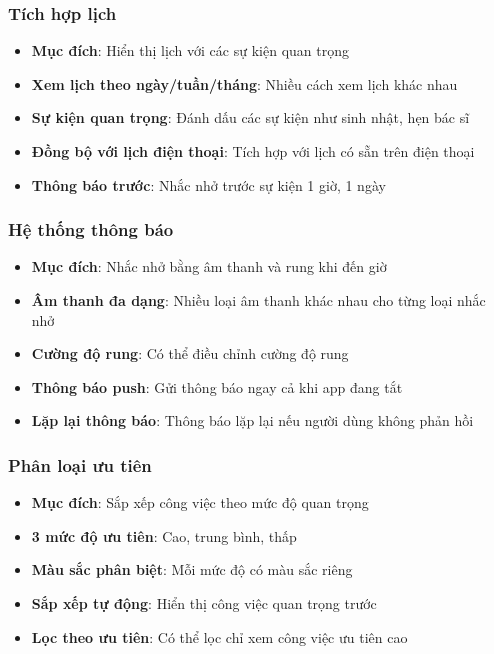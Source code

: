 \documentclass[12pt,a4paper]{article}
\begin{document}
\subsubsection{Tích hợp lịch}
\begin{itemize}[leftmargin=2cm]
    \item \textbf{Mục đích}: Hiển thị lịch với các sự kiện quan trọng
    \item \textbf{Xem lịch theo ngày/tuần/tháng}: Nhiều cách xem lịch khác nhau
    \item \textbf{Sự kiện quan trọng}: Đánh dấu các sự kiện như sinh nhật, hẹn bác sĩ
    \item \textbf{Đồng bộ với lịch điện thoại}: Tích hợp với lịch có sẵn trên điện thoại
    \item \textbf{Thông báo trước}: Nhắc nhở trước sự kiện 1 giờ, 1 ngày
\end{itemize}

\subsubsection{Hệ thống thông báo}
\begin{itemize}[leftmargin=2cm]
    \item \textbf{Mục đích}: Nhắc nhở bằng âm thanh và rung khi đến giờ
    \item \textbf{Âm thanh đa dạng}: Nhiều loại âm thanh khác nhau cho từng loại nhắc nhở
    \item \textbf{Cường độ rung}: Có thể điều chỉnh cường độ rung
    \item \textbf{Thông báo push}: Gửi thông báo ngay cả khi app đang tắt
    \item \textbf{Lặp lại thông báo}: Thông báo lặp lại nếu người dùng không phản hồi
\end{itemize}

\subsubsection{Phân loại ưu tiên}
\begin{itemize}[leftmargin=2cm]
    \item \textbf{Mục đích}: Sắp xếp công việc theo mức độ quan trọng
    \item \textbf{3 mức độ ưu tiên}: Cao, trung bình, thấp
    \item \textbf{Màu sắc phân biệt}: Mỗi mức độ có màu sắc riêng
    \item \textbf{Sắp xếp tự động}: Hiển thị công việc quan trọng trước
    \item \textbf{Lọc theo ưu tiên}: Có thể lọc chỉ xem công việc ưu tiên cao
\end{itemize}
\end{document}
